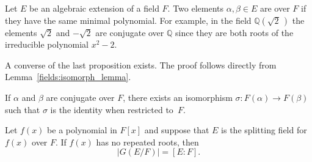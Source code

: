 \medskip
 
Let $E$ be an algebraic extension of a field $F$.  Two elements $\alpha, \beta \in E$ are  over $F$ if they have the same minimal polynomial. For example, in the field ${\mathbb Q}( \sqrt{2}\, )$ the elements $\sqrt{2}$ and $-\sqrt{2}$ are conjugate over ${\mathbb Q}$ since they are both roots of the irreducible polynomial $x^2 - 2$.  
 
A converse of the last proposition exists. The proof follows directly from Lemma~\ref{fields:isomorph_lemma}. 

\begin{proposition}
If $\alpha$ and $\beta$ are conjugate over $F$, there exists an isomorphism $\sigma : F( \alpha ) \rightarrow F( \beta )$ such that $\sigma$ is the identity when restricted to~$F$.
\end{proposition}

\begin{theorem}\label{galois:extension_order_theorem}
Let $f(x)$ be a polynomial in $F[x]$ and suppose that $E$ is the splitting field for $f(x)$ over $F$.  If $f(x)$ has no repeated roots, then 
\[
|G(E/F)| = [E:F].
\]
\end{theorem}
 
